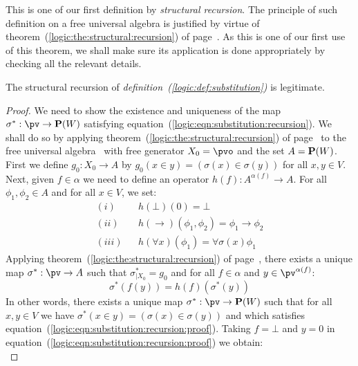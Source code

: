 This is one of our first definition by {\em structural recursion}.
The principle of such definition on a free universal algebra is
justified by virtue of
theorem~(\ref{logic:the:structural:recursion}) of
page~\pageref{logic:the:structural:recursion}. As this is one of our
first use of this theorem, we shall make sure its application is
done appropriately by checking all the relevant details.
\begin{prop}\label{logic:prop:substitution}
    The structural recursion of {\em definition~(\ref{logic:def:substitution})} 
    is legitimate.
\end{prop}
\begin{proof}
    We need to show the existence and uniqueness of the map
    $\sigma^{*}:\pv\to{\bf P}(W)$ satisfying
    equation~(\ref{logic:eqn:substitution:recursion}). We shall do so by
    applying theorem~(\ref{logic:the:structural:recursion}) of
    page~\pageref{logic:the:structural:recursion} to the free universal
    algebra \pv\ with free generator $X_{0}=\pvo$ and the set $A={\bf
    P}(W)$. First we define $g_{0}:X_{0}\to A$ by $g_{0}(x\in
    y)=(\sigma(x)\in\sigma(y))$ for all $x,y\in V$. Next, given
    $f\in\alpha$ we need to define an operator $h(f):A^{\alpha(f)}\to
    A$. For all $\phi_{1},\phi_{2}\in A$ and for all $x\in V$, we set:
    \begin{eqnarray*}
        (i)&&h(\bot)(0)=\bot
        \\
        (ii)&&h(\to)(\phi_{1},\phi_{2})=\phi_{1}\to\phi_{2}
        \\
        (iii)&&h(\forall x)(\phi_{1})=\forall \sigma(x)\phi_{1}
    \end{eqnarray*}
    Applying theorem~(\ref{logic:the:structural:recursion}) of
    page~\pageref{logic:the:structural:recursion}, there exists a unique
    map $\sigma^{*}:\pv\to A$ such that $\sigma^{*}_{|X_{0}}=g_{0}$ and
    for all $f\in\alpha$ and $y\in\pv^{\alpha(f)}$:
    \begin{equation}\label{logic:eqn:substitution:recursion:proof}
        \sigma^{*}(f(y))=h(f)(\sigma^{*}(y))
    \end{equation}
    In other words, there exists a unique map $\sigma^{*}:\pv\to{\bf
    P}(W)$ such that for all $x,y\in V$ we have  $\sigma^{*}(x\in
    y)=(\sigma(x)\in\sigma(y))$  and which satisfies
    equation~(\ref{logic:eqn:substitution:recursion:proof}). Taking
    $f=\bot$ and $y=0$ in
    equation~(\ref{logic:eqn:substitution:recursion:proof}) we obtain:
    \begin{equation}\label{logic:eqn:substitution:bot}

\end{equation}
\end{proof}
